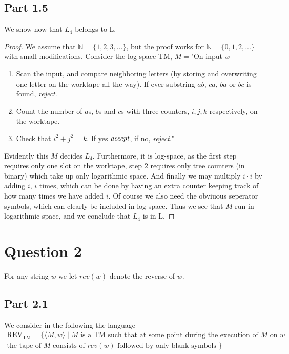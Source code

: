 \documentclass[a4paper,11pt]{article}
\newcommand{\N}{\mathbb{N}}
\numberwithin{equation}{section}
\begin{document}
	\subsection*{Part 1.5}
	We show now that $ L_4 $ belongs to L.
	\begin{proof}
	We assume that $ \N=\{1,2,3,...\} $, but the proof works for $ \N=\{0,1,2,...\} $ with small modifications. Consider the log-space TM, $ M= $"On input $ w $\begin{enumerate}
			\item Scan the input, and compare neighboring letters (by storing and overwriting one letter on the worktape all the way). If ever substring $ ab $, $ ca $, $ ba $ or $ bc $ is found, \emph{reject}.
			\item Count the number of $ a $s, $ b $s and $ c $s with three counters, $ i,j,k $ respectively, on the worktape. 
			\item Check that $ i^2+j^2=k $. If yes $ \emph{accept} $, if no, \emph{reject}."	
			\end{enumerate}
			Evidently this $ M $ decides $ L_4 $. Furthermore, it is log-space, as the first step requires only one slot on the worktape, step $ 2 $ requires only tree counters (in binary) which take up only logarithmic space. And finally we may multiply $ i\cdot i $ by adding $ i $, $ i $ times, which can be done by having an extra counter keeping track of how many times we have added $ i $. Of course we also need the obviuous seperator symbols, which can clearly be included in log space. Thus we see that $ M $ run in logarithmic space, and we conclude that $ L_4 $ is in L.
	\end{proof}
	\section*{Question 2}
	For any string $ w $ we let $ rev(w) $ denote the reverse of $ w $.
	\subsection*{Part 2.1}
	We consider in the following the language 
	\begin{equation*}
		\begin{aligned}
		\mathrm{REV}_{\mathrm{TM}}=\{\langle M, w\rangle \mid M\text{ is a TM such that at some point during the execution of $M$ on $w$}\\
		\text{the tape of $M$ consists of $rev(w)$ followed by only blank symbols }\}
		\end{aligned}
	\end{equation*}
\end{document}
